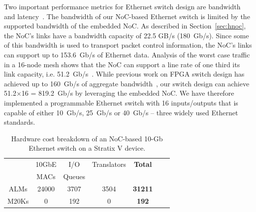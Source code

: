 Two important performance metrics for Ethernet switch design are bandwidth and latency~\cite{elhanany2005network}.
The bandwidth of our NoC-based Ethernet switch is limited by the supported bandwidth of the embedded NoC.
As described in Section~\ref{sec:hnoc}, the NoC's links have a bandwidth capacity of 22.5 GB/s (180~Gb/s).
Since some of this bandwidth is used to transport packet control information, the NoC's links can support up to 153.6~Gb/s of Ethernet data.
Analysis of the worst case traffic in a 16-node mesh shows that the NoC can support a line rate of one third its link capacity, i.e. 51.2~Gb/s~\cite{Bitar2014}.
While previous work on FPGA switch design has achieved up to 160~Gb/s of aggregate bandwidth~\cite{dai-zhu}, our switch design can achieve 51.2$\times$16 = 819.2~Gb/s by leveraging the embedded NoC.
We have therefore implemented a programmable Ethernet switch with 16 inputs/outputs that is capable of either 10~Gb/s, 25~Gb/s or 40~Gb/s -- three widely used Ethernet standards.

%
%
\begin{table}[!t]
\centering
\begin{small}
    \caption{Hardware cost breakdown of an NoC-based 10-Gb Ethernet switch on a Stratix V device.}
    \label{tbl:hcost}
    \begin{tabular}{ccccccc}
    \toprule
     & 10GbE & I/O & Translators & \textbf{Total} \\
     & MACs & Queues &  & & \\
    \midrule
	ALMs & 24000  & 3707 &  3504 & \textbf{31211} \\ 
	M20Ks & 0    & 192   & 0 & \textbf{192}   \\
    \bottomrule
    \end{tabular}
\end{small}
\end{table}
%
%

